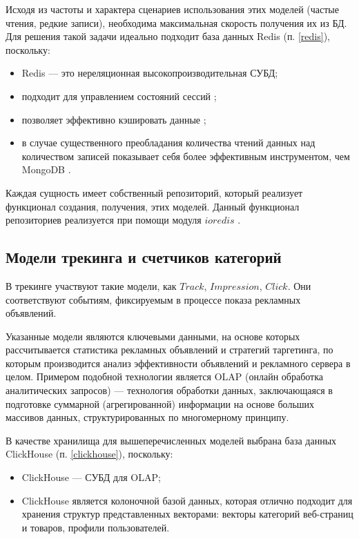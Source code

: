 \documentclass[specification,annotation,times]{itmo-student-thesis}
\begin{document}

Исходя из частоты и характера сценариев использования этих моделей (частые чтения, редкие записи), необходима максимальная скорость получения их из БД. Для решения такой задачи идеально подходит база данных Redis (п. \ref{redis}), поскольку:
\begin{itemize}
\item Redis — это нереляционная высокопроизводительная СУБД;
\item подходит для управлением состояний сессий \cite{redis-session-management};
\item позволяет эффективно кэшировать данные \cite{redis-caching};
\item в случае существенного преобладания количества чтений данных над количеством записей показывает себя более эффективным инструментом, чем MongoDB \cite{redis-vs-mongodb}.
\end{itemize}

Каждая сущность имеет собственный репозиторий, который реализует функционал создания, получения, этих моделей. Данный функционал репозиториев реализуется при помощи модуля $ioredis$ \cite{ioredis}.

\subsection{Модели трекинга и счетчиков категорий}

В трекинге участвуют такие модели, как $Track$, $Impression$, $Click$. Они соответствуют событиям, фиксируемым в процессе показа рекламных объявлений.


Указанные модели являются ключевыми данными, на основе которых рассчитывается статистика рекламных объявлений и стратегий таргетинга, по которым производится анализ эффективности объявлений и рекламного сервера в целом. Примером подобной технологии является OLAP (онлайн обработка аналитических запросов) — технология обработки данных, заключающаяся в подготовке суммарной (агрегированной) информации на основе больших массивов данных, структурированных по многомерному принципу.

В качестве хранилища для вышеперечисленных моделей выбрана база данных ClickHouse (п. \ref{clickhouse}), поскольку:
\begin{itemize}
\item ClickHouse — СУБД для OLAP;
\item ClickHouse является колоночной базой данных, которая отлично подходит для хранения структур представленных векторами: векторы категорий веб-страниц и товаров, профили пользователей.
\end{itemize}
\end{document}
